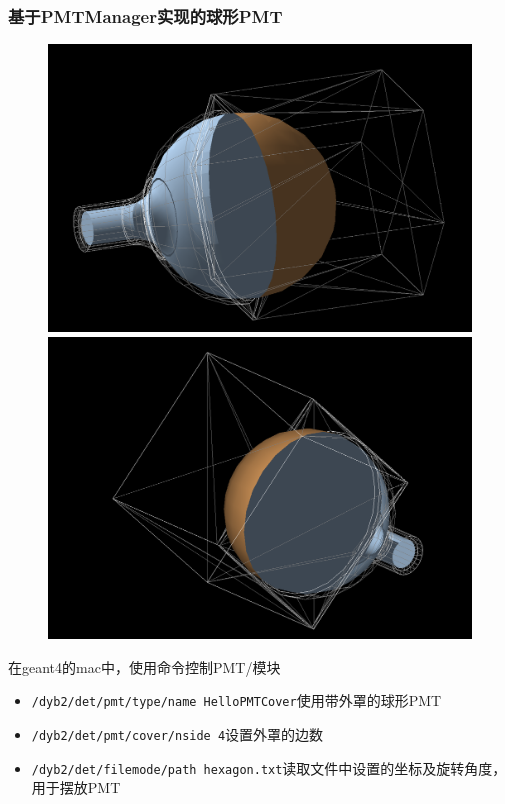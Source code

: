 \begin{frame}
    \frametitle{基于PMTManager实现的球形PMT}
    \begin{figure}
        \centering
        \includegraphics[width=.5\textwidth,keepaspectratio]{data/newpmt-6-sides.png}
        \includegraphics[width=.5\textwidth,keepaspectratio]{data/newpmt-4-sides.png}
    \end{figure}
    在geant4的mac中，使用命令控制PMT/模块
    \begin{itemize}
        \item {\tt /dyb2/det/pmt/type/name HelloPMTCover}使用带外罩的球形PMT
        \item {\tt /dyb2/det/pmt/cover/nside 4}设置外罩的边数
        \item {\tt /dyb2/det/filemode/path
            hexagon.txt}读取文件中设置的坐标及旋转角度，用于摆放PMT
    \end{itemize}
\end{frame}

